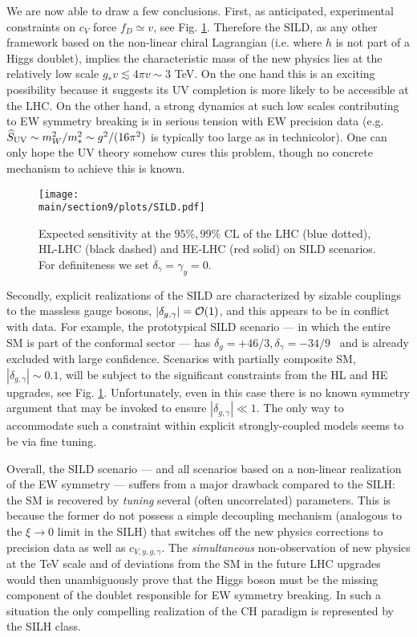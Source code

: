 We are now able to draw a few conclusions. First, as anticipated, experimental constraints on $c_V$ force $f_D\simeq v$, see Fig. \ref{SILD}. Therefore the SILD, as any other framework based on the non-linear chiral Lagrangian (i.e. where $h$ is not part of a Higgs doublet), implies the characteristic mass of the new physics lies at the relatively low scale $g_*v\lesssim4\pi v\sim3$ TeV. On the one hand this is an exciting possibility because it suggests its UV completion is more likely to be accessible at the LHC. On the other hand, a strong dynamics at such low scales contributing to EW symmetry breaking is in serious tension with EW precision data (e.g. $\widehat S_{\rm UV}\sim m_W^2/m_*^2\sim g^2/(16\pi^2)$ is typically too large as in technicolor). One can only hope the UV theory somehow cures this problem, though no concrete mechanism to achieve this is known.


\begin{figure}[t]
\begin{center}
\texttt{[image: \\main/section9/plots/SILD.pdf]}
\caption{Expected sensitivity at the $95\%, 99\%$ CL of the LHC (blue dotted), HL-LHC (black dashed) and HE-LHC (red solid) on SILD scenarios. For definiteness we set $\delta_\gamma=\gamma_y=0$.
}\label{SILD}
\end{center}
\end{figure}


Secondly, explicit realizations of the SILD are characterized by sizable couplings to the massless gauge bosons, $|\delta_{g,\gamma}|={\cal O}(1)$, and this appears to be in conflict with data. For example, the prototypical SILD scenario --- in which the entire SM is part of the conformal sector --- has $\delta_{g}=+46/3, \delta_\gamma=-34/9$~\cite{Goldberger:2008zz} and is already excluded with large confidence. Scenarios with partially composite SM, $|\delta_{g,\gamma}|\sim0.1$, will be subject to the significant constraints from the HL and HE upgrades, see Fig. \ref{SILD}. Unfortunately, even in this case there is no known symmetry argument that may be invoked to ensure $|\delta_{g,\gamma}|\ll1$. The only way to accommodate such a constraint within explicit strongly-coupled models seems to be via fine tuning.





Overall, the SILD scenario --- and all scenarios based on a non-linear realization of the EW symmetry --- suffers from a major drawback compared to the SILH: the SM is recovered by {\emph{tuning}} several (often uncorrelated) parameters. This is because the former do not possess a simple decoupling mechanism (analogous to the $\xi\to0$ limit in the SILH) that switches off the new physics corrections to precision data as well as $c_{V,y,g,\gamma}$. The {\emph{simultaneous}} non-observation of new physics at the TeV scale and of deviations from the SM in the future LHC upgrades would then unambiguously prove that the Higgs boson must be the missing component of the doublet responsible for EW symmetry breaking. In such a situation the only compelling realization of the CH paradigm is represented by the SILH class.




